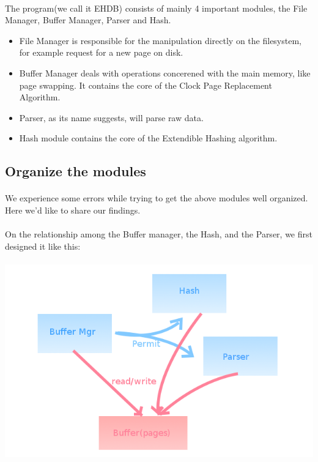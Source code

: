 \documentclass[a4paper, 12pt]{article}
\begin{document}
        \paragraph{}
            The program(we call it EHDB) consists of mainly 4 important modules, the File Manager, Buffer Manager, Parser and Hash.
        \begin{itemize}
            \item File Manager is responsible for the manipulation directly on the filesystem, for example request for a new page on disk.
            \item Buffer Manager deals with operations concerened with the main memory, like page swapping. It contains the core of the Clock Page Replacement Algorithm.
            \item Parser, as its name suggests, will parse raw data.
            \item Hash module contains the core of the Extendible Hashing algorithm.
        \end{itemize}
    \subsection{Organize the modules}
        \paragraph{}
            We experience some errors while trying to get the above modules well organized. Here we'd like to share our findings.
        \paragraph{}
            On the relationship among the Buffer manager, the Hash, and the Parser, we first designed it like this:
        \paragraph{} \includegraphics[scale=0.5]{img/arch1.png}
\end{document}
